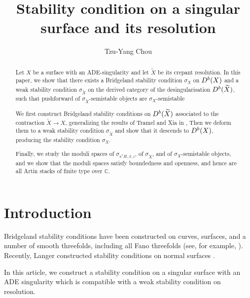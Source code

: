 \documentclass[12pt]{amsart}
\title[Stability condition on a singular surface and its resolution]{Stability condition on a singular surface and its resolution}
\author[Tzu-Yang Chou]{Tzu-Yang Chou}
\theoremstyle{definition}
\begin{document}
\begin{abstract} Let $X$ be a surface with an ADE-singularity and let $\widetilde{X}$ be its crepant resolution.
In this paper, we show that there exists a Bridgeland stability condition $\sigma_X$ on ${\rm D}^b(X)$ and a weak stability condition $\sigma_{\widetilde{X}}$ on the derived category of the desingularisation ${\rm D}^b(\widetilde{X})$,
such that pushforward of $\sigma_{\widetilde{X}}$-semistable objects are $\sigma_X$-semistable

We first construct Bridgeland stability conditions on  ${\rm D}^b(\widetilde{X})$ associated to the contraction $\widetilde{X} \longrightarrow X$, generalizing the results of Tramel and Xia in \cite{TX22},
Then we deform them to a weak stability condition $\sigma_{\widetilde{X}}$ and show that it descends to ${\rm D}^b(X)$, producing the stability condition $\sigma_X$.

Finally, we study the moduli spaces of $\sigma_{\pi^\ast H,\beta,z}$, of $\sigma_{\widetilde{X}}$, and of $\sigma_X$-semistable objects,
and we show that the moduli spaces satisfy boundedness and openness, and hence are all Artin stacks of finite type over $\mathbb{C}$.
\end{abstract}

\maketitle

\section{Introduction}
Bridgeland stability conditions have been constructed on curves, surfaces, and a number of smooth threefolds, including all Fano threefolds (see, for example, \cite{Bri08,BMMS12,Li19}).
Recently, Langer constructed stability conditions on normal surfaces \cite{Lan24}.

In this article,  we construct a stability condition on a singular surface with an ADE singularity which is   compatible with a weak stability condition on resolution. 
\end{document}
